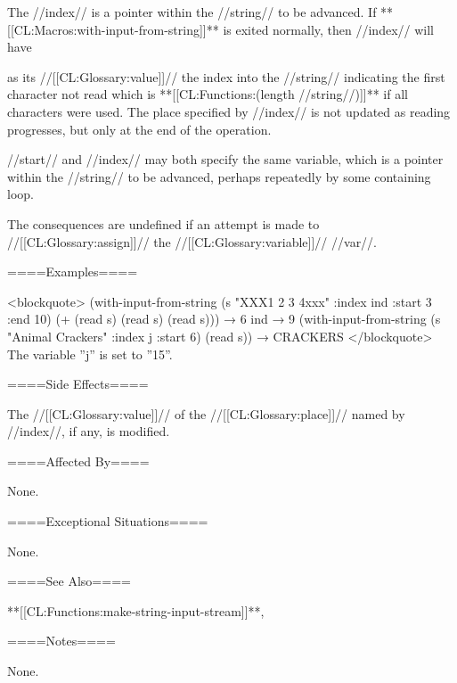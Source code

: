 The //index// is a pointer within the //string// to be advanced. If **[[CL:Macros:with-input-from-string]]** is exited normally, then //index// will have

as its //[[CL:Glossary:value]]// the index into the //string// indicating the first character not read which is **[[CL:Functions:(length //string//)]]** if all characters were used. The place specified by //index// is not updated as reading progresses, but only at the end of the operation.

//start// and //index// may both specify the same variable, which is a pointer within the //string// to be advanced, perhaps repeatedly by some containing loop.

The consequences are undefined if an attempt is made to //[[CL:Glossary:assign]]// the //[[CL:Glossary:variable]]// //var//.

====Examples====

<blockquote> (with-input-from-string (s "XXX1 2 3 4xxx" :index ind :start 3 :end 10) (+ (read s) (read s) (read s))) → 6 ind → 9 (with-input-from-string (s "Animal Crackers" :index j :start 6) (read s)) → CRACKERS </blockquote> The variable ''j'' is set to ''15''.

====Side Effects====

The //[[CL:Glossary:value]]// of the //[[CL:Glossary:place]]// named by //index//, if any, is modified.

====Affected By====

None.

====Exceptional Situations====

None.

====See Also====

**[[CL:Functions:make-string-input-stream]]**,

{\secref\TraversalRules}

====Notes====

None.

     
